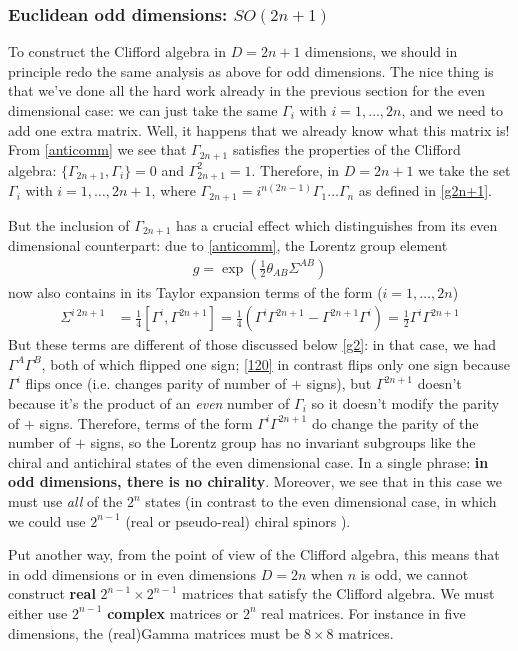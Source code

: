 \documentclass[a4paper,12pt]{article}
\numberwithin{equation}{section}
\numberwithin{exe}{section}
\newcommand{\G}{{\Gamma}}
\begin{document}
\subsubsection{Euclidean odd dimensions: $SO(2n+1)$}

To construct the Clifford algebra in $D=2n+1$ dimensions, we should in principle redo the same analysis as above for odd dimensions. The nice thing is that we've done all the hard work already in the previous section for the even dimensional case: we can just take the same $\G_i$ with $i=1,\hdots, 2n$, and we need to add one extra matrix. Well, it happens that we already know what this matrix is! From \eqref{anticomm} we see that $\G_{2n+1}$ satisfies the properties of the Clifford algebra: $\{ \G_{2n+1},\G_i \}=0$ and $\G_{2n+1}^2=1$. Therefore, in $D=2n+1$ we take the set $\G_i$ with $i=1,\hdots, 2n+1$, where $\G_{2n+1}=i^{n(2n-1)} \G_1\hdots \G_n$ as defined in \eqref{g2n+1}.

But the inclusion of $\G_{2n+1}$ has a crucial effect which distinguishes from its even dimensional counterpart: due to \eqref{anticomm}, the Lorentz group element
	\begin{align}\label{}
	g=\exp\left( \frac{1}{2}\theta_{AB}\Sigma^{AB} \right)
	\end{align}
now also contains in its Taylor expansion terms of the form ($i=1,\hdots, 2n$)
	\begin{align}\label{}
	\Sigma^{i\ 2n+1}&=\frac{1}{4}[\G^i,\G^{2n+1}]=\frac{1}{4}\left( \G^i\G^{2n+1} - \G^{2n+1} \G^i  \right) = \frac{1}{2} \G^i \G^{2n+1} \label{120}
	\end{align}
But these terms are different of those discussed below \eqref{g2}: in that case, we had $\G^A \G^B$, both of which flipped one sign; \eqref{120} in contrast flips only one sign because $\G^i$ flips once (i.e. changes parity of number of $+$ signs), but $\G^{2n+1}$ doesn't because it's the product of an \textit{even} number of $\G_i$ so it doesn't modify the parity of $+$ signs. Therefore, terms of the form $\G^i\G^{2n+1}$ do change the parity of the number of $+$ signs, so the Lorentz group has no invariant subgroups like the chiral and antichiral states of the even dimensional case. In a single phrase: \textbf{in odd dimensions, there is no chirality}. Moreover, we see that in this case we must use \textit{all} of the $2^n$ states (in contrast to the even dimensional case, in which we could use $2^{n-1}$ (real or pseudo-real) chiral spinors ).

Put another way, from the point of view of the Clifford algebra, this means that in odd dimensions or in even dimensions $D=2n$ when $n$ is odd, we cannot construct \textbf{real} $2^{n-1}\times 2^{n-1}$ matrices that satisfy the Clifford algebra. We must either use $2^{n-1}$ \textbf{complex} matrices or $2^n$ real matrices. For instance in five dimensions, the (real)Gamma matrices must be $8\times 8$ matrices.
\end{document}
